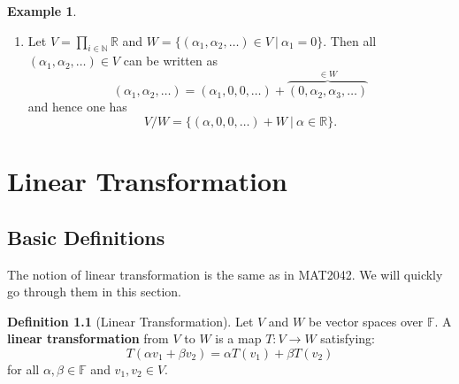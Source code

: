 \documentclass[11pt,openany]{book}
\theoremstyle{plain}
\theoremstyle{definition}
\newtheorem{definition}[definition]{Definition}
\newtheorem{example}[example]{Example}
\theoremstyle{remark}
\begin{document}
\begin{example}
\begin{enumerate}
    \item Let $V = \prod_{i \in \mathbb{N}} \mathbb{R}$ and $W = \{(\alpha_1, \alpha_2, \dots) \in V \ |\ \alpha_1  = 0\}$. Then all $(\alpha_1, \alpha_2, \dots) \in V$ can be written as
    $$(\alpha_1, \alpha_2, \dots) = (\alpha_1, 0, 0, \dots) + \overbrace{(0,\alpha_2, \alpha_3, \dots)}^{\in W}$$
    and hence one has 
    $$V/W = \{(\alpha,0,0,\dots) + W\ |\ \alpha \in \mathbb{R}\}.$$
\end{enumerate}
\end{example}


\chapter{Linear Transformation}
\section{Basic Definitions}
The notion of linear transformation is the same as in MAT2042. We will quickly go through them in this section.
\begin{definition}[Linear Transformation]
    Let $V$ and $W$ be vector spaces over $\mathbb{F}$. A {\bf linear transformation} from $V$ to $W$ is a map $T:V \to W$ satisfying:
    $$T(\alpha v_1 + \beta v_2) = \alpha T(v_1) + \beta T(v_2)$$
    for all $\alpha, \beta \in \mathbb{F}$ and $v_1, v_2 \in V$.
\end{definition}
\end{document}
